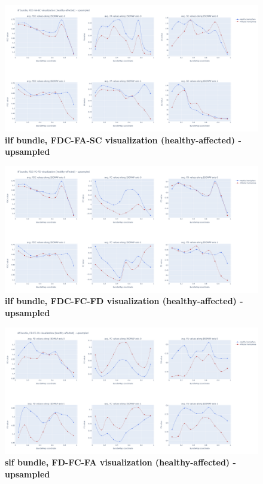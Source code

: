 \documentclass[thesis.tex]{subfiles}
\begin{document}
\begin{figure}
  \centering
  \includegraphics[width=24cm]{thesis_radomskyi/apendix/ilf bundle, FDC-FA-SC visualization (healthy-affected) - upsampled.png}
    \caption{\textbf{ilf bundle, FDC-FA-SC visualization (healthy-affected) - upsampled}}
\end{figure}

\begin{figure}
  \centering
  \includegraphics[width=24cm]{thesis_radomskyi/apendix/ilf bundle, FDC-FC-FD visualization (healthy-affected) - upsampled.png}
    \caption{\textbf{ilf bundle, FDC-FC-FD visualization (healthy-affected) - upsampled}}
\end{figure}

\begin{figure}
  \centering
  \includegraphics[width=24cm]{thesis_radomskyi/apendix/slf bundle, FD-FC-FA visualization (healthy-affected) - upsampled.png}
    \caption{\textbf{slf bundle, FD-FC-FA visualization (healthy-affected) - upsampled}}
\end{figure}
\end{document}
